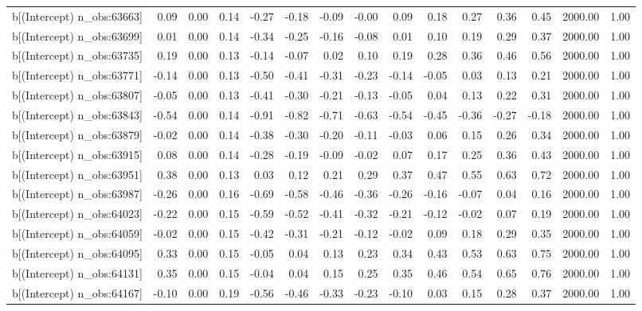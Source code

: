 \begin{table}[ht]
\begin{tabular}{rrrrrrrrrrrrrrr}
  b[(Intercept) n\_obs:63663] & 0.09 & 0.00 & 0.14 & -0.27 & -0.18 & -0.09 & -0.00 & 0.09 & 0.18 & 0.27 & 0.36 & 0.45 & 2000.00 & 1.00 \\ 
  b[(Intercept) n\_obs:63699] & 0.01 & 0.00 & 0.14 & -0.34 & -0.25 & -0.16 & -0.08 & 0.01 & 0.10 & 0.19 & 0.29 & 0.37 & 2000.00 & 1.00 \\ 
  b[(Intercept) n\_obs:63735] & 0.19 & 0.00 & 0.13 & -0.14 & -0.07 & 0.02 & 0.10 & 0.19 & 0.28 & 0.36 & 0.46 & 0.56 & 2000.00 & 1.00 \\ 
  b[(Intercept) n\_obs:63771] & -0.14 & 0.00 & 0.13 & -0.50 & -0.41 & -0.31 & -0.23 & -0.14 & -0.05 & 0.03 & 0.13 & 0.21 & 2000.00 & 1.00 \\ 
  b[(Intercept) n\_obs:63807] & -0.05 & 0.00 & 0.13 & -0.41 & -0.30 & -0.21 & -0.13 & -0.05 & 0.04 & 0.13 & 0.22 & 0.31 & 2000.00 & 1.00 \\ 
  b[(Intercept) n\_obs:63843] & -0.54 & 0.00 & 0.14 & -0.91 & -0.82 & -0.71 & -0.63 & -0.54 & -0.45 & -0.36 & -0.27 & -0.18 & 2000.00 & 1.00 \\ 
  b[(Intercept) n\_obs:63879] & -0.02 & 0.00 & 0.14 & -0.38 & -0.30 & -0.20 & -0.11 & -0.03 & 0.06 & 0.15 & 0.26 & 0.34 & 2000.00 & 1.00 \\ 
  b[(Intercept) n\_obs:63915] & 0.08 & 0.00 & 0.14 & -0.28 & -0.19 & -0.09 & -0.02 & 0.07 & 0.17 & 0.25 & 0.36 & 0.43 & 2000.00 & 1.00 \\ 
  b[(Intercept) n\_obs:63951] & 0.38 & 0.00 & 0.13 & 0.03 & 0.12 & 0.21 & 0.29 & 0.37 & 0.47 & 0.55 & 0.63 & 0.72 & 2000.00 & 1.00 \\ 
  b[(Intercept) n\_obs:63987] & -0.26 & 0.00 & 0.16 & -0.69 & -0.58 & -0.46 & -0.36 & -0.26 & -0.16 & -0.07 & 0.04 & 0.16 & 2000.00 & 1.00 \\ 
  b[(Intercept) n\_obs:64023] & -0.22 & 0.00 & 0.15 & -0.59 & -0.52 & -0.41 & -0.32 & -0.21 & -0.12 & -0.02 & 0.07 & 0.19 & 2000.00 & 1.00 \\ 
  b[(Intercept) n\_obs:64059] & -0.02 & 0.00 & 0.15 & -0.42 & -0.31 & -0.21 & -0.12 & -0.02 & 0.09 & 0.18 & 0.29 & 0.35 & 2000.00 & 1.00 \\ 
  b[(Intercept) n\_obs:64095] & 0.33 & 0.00 & 0.15 & -0.05 & 0.04 & 0.13 & 0.23 & 0.34 & 0.43 & 0.53 & 0.63 & 0.75 & 2000.00 & 1.00 \\ 
  b[(Intercept) n\_obs:64131] & 0.35 & 0.00 & 0.15 & -0.04 & 0.04 & 0.15 & 0.25 & 0.35 & 0.46 & 0.54 & 0.65 & 0.76 & 2000.00 & 1.00 \\ 
  b[(Intercept) n\_obs:64167] & -0.10 & 0.00 & 0.19 & -0.56 & -0.46 & -0.33 & -0.23 & -0.10 & 0.03 & 0.15 & 0.28 & 0.37 & 2000.00 & 1.00 \\ 

\end{tabular}
\end{table}
